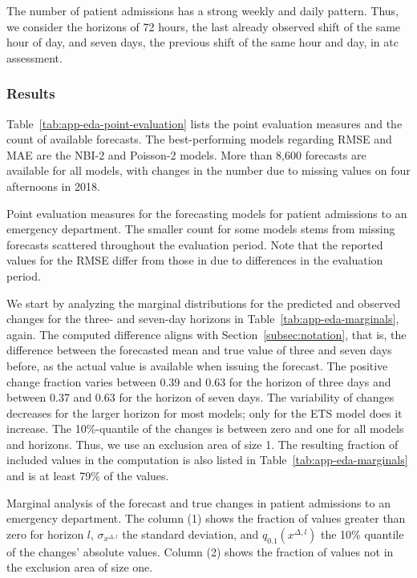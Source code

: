 \documentclass[pdflatex]{sn-jnl}
\theoremstyle{plain}%
\theoremstyle{definition}
\begin{document}
The number of patient admissions has a strong weekly and daily pattern.
Thus, we consider the horizons of 72 hours, the last already observed shift of the same hour of day, and seven days, the previous shift of the same hour and day, in \ac{atc} assessment.

\subsubsection*{Results}

Table~\ref{tab:app-eda-point-evaluation} lists the point evaluation measures and the count of available forecasts.
The best-performing models regarding RMSE and MAE are the NBI-2 and Poisson-2 models.
More than 8,600 forecasts are available for all models, with changes in the number due to missing values on four afternoons in 2018.

\begin{table}
\centering

\caption[Point evaluation measures for forecasting models of patient admissions to an emergency department.]{Point evaluation measures for the forecasting models for patient admissions to an emergency department. The smaller count for some models stems from missing forecasts scattered throughout the evaluation period. Note that the reported values for the RMSE differ from those in \citet{Rostami-Tabar2023} due to differences in the evaluation period.}\label{tab:app-eda-point-evaluation}
\end{table}

We start by analyzing the marginal distributions for the predicted and observed changes for the three- and seven-day horizons in Table~\ref{tab:app-eda-marginals}, again.
The computed difference aligns with Section~\ref{subsec:notation}, that is, the difference between the forecasted mean and true value of three and seven days before, as the actual value is available when issuing the forecast.
The positive change fraction varies between 0.39 and 0.63 for the horizon of three days and between 0.37 and 0.63 for the horizon of seven days.
The variability of changes decreases for the larger horizon for most models; only for the ETS model does it increase.
The 10\%-quantile of the changes is between zero and one for all models and horizons.
Thus, we use an exclusion area of size 1.
The resulting fraction of included values in the computation is also listed in Table~\ref{tab:app-eda-marginals} and is at least 79\% of the values.

\begin{table}
    \centering
    \tiny
    
    \caption[Marginal analysis of the forecast and true changes in patient admissions to an emergency department.]{Marginal analysis of the forecast and true changes in patient admissions to an emergency department. The column (1) shows the fraction of values greater than zero for horizon $l$, $\sigma_{x^{\Delta, l}}$ the standard deviation, and $q_{0.1} (x^{\Delta, l})$ the 10\% quantile of the changes' absolute values. Column (2) shows the fraction of values not in the exclusion area of size one.}
    \label{tab:app-eda-marginals}
\end{table}
\end{document}
